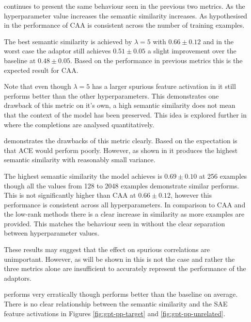  continues to present the same behaviour seen in the previous two metrics.
As the hyperparameter value increases the semantic similarity increases.
As hypothesised in  the performance of CAA is consistent across the number of training examples.

The best semantic similarity is achieved by $\lambda = 5$ with $0.66 \pm 0.12$ and in the worst case the adaptor still achieves $0.51 \pm 0.05$ a slight improvement over the baseline at $0.48 \pm 0.05$.
Based on the performance in previous metrics this is the expected result for CAA.

Note that even though $\lambda = 5$ has a larger spurious feature activation in  it still performs better than the other hyperparameters.
This demonstrates one drawback of this metric on it's own, a high semantic similarity does not mean that the context of the model has been preserved.
This idea is explored further in  where the completions are analysed quantitatively.

 demonstrates the drawbacks of this metric clearly.
Based on  the expectation is that ACE would perform poorly.
However, as shown in  it produces the highest semantic similarity with reasonably small variance.

The highest semantic similarity the model achieves is $0.69 \pm 0.10$ at 256 examples though all the values from 128 to 2048 examples demonstrate similar performs.
This is not significantly higher than CAA at $0.66 \pm 0.12$, however this performance is consistent across all hyperparameters.
In comparison to CAA and the low-rank methods there is a clear increase in similarity as more examples are provided.
This matches the behaviour seen in  without the clear separation between hyperparameter values.

These results may suggest that the effect on spurious correlations are unimportant.
However, as will be shown in  this is not the case and rather the three metrics alone are insufficient to accurately represent the performance of the adaptors.

 performs very erratically though performs better than the baseline on average.
There is no clear relationship between the semantic similarity and the SAE feature activations in Figures \ref{fig:gpt-pp-target} and \ref{fig:gpt-pp-unrelated}.

